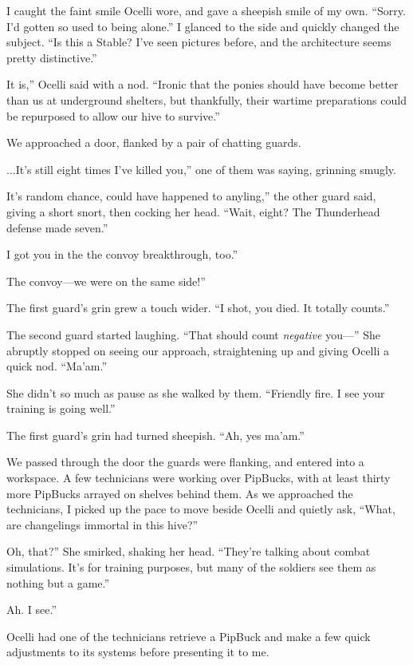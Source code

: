 I caught the faint smile Ocelli wore, and gave a sheepish smile of my own. “Sorry. I’d gotten so used to being alone.” I glanced to the side and quickly changed the subject. “Is this a Stable? I’ve seen pictures before, and the architecture seems pretty distinctive.”

\leavevmode{}It is,” Ocelli said with a nod. “Ironic that the ponies should have become better than us at underground shelters, but thankfully, their wartime preparations could be repurposed to allow our hive to survive.”

We approached a door, flanked by a pair of chatting guards.

\leavevmode{}...It’s still eight times I’ve killed you,” one of them was saying, grinning smugly.

\leavevmode{}It’s random chance, could have happened to anyling,” the other guard said, giving a short snort, then cocking her head. “Wait, eight? The Thunderhead defense made seven.”

\leavevmode{}I got you in the the convoy breakthrough, too.”

\leavevmode{}The convoy—we were on the same side!”

The first guard’s grin grew a touch wider. “I shot, you died. It totally counts.”

The second guard started laughing. “That should count \textit{negative} you—” She abruptly stopped on seeing our approach, straightening up and giving Ocelli a quick nod. “Ma’am.”

She didn’t so much as pause as she walked by them. “Friendly fire. I see your training is going well.”

The first guard’s grin had turned sheepish. “Ah, yes ma’am.”

We passed through the door the guards were flanking, and entered into a workspace. A few technicians were working over PipBucks, with at least thirty more PipBucks arrayed on shelves behind them. As we approached the technicians, I picked up the pace to move beside Ocelli and quietly ask, “What, are changelings immortal in this hive?”

\leavevmode{}Oh, that?” She smirked, shaking her head. “They’re talking about combat simulations. It’s for training purposes, but many of the soldiers see them as nothing but a game.”

\leavevmode{}Ah. I see.”

Ocelli had one of the technicians retrieve a PipBuck and make a few quick adjustments to its systems before presenting it to me.


